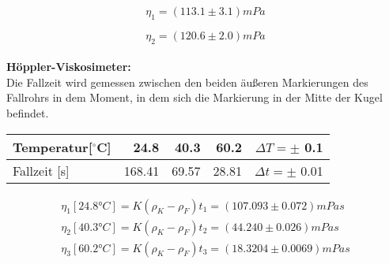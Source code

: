 \documentclass{article}
\begin{document}
$$  \eta_1 =   (113.1 \pm 3.1)mPa $$ 
 
$$  \eta_2 =   (120.6 \pm 2.0)mPa $$ \\

\textbf{Höppler-Viskosimeter:}\\
Die Fallzeit wird gemessen zwischen den beiden äußeren Markierungen des Fallrohrs in dem Moment, in dem sich die Markierung in der Mitte der Kugel befindet.\\
\begin{center}
\begin{tabular}{|l||r|r|r||r|}
\hline
Temperatur[$^\circ$C] & 24.8 & 40.3 & 60.2 & $\Delta T=\pm$ 0.1\\
\hline
Fallzeit [s] & 168.41 & 69.57 &  28.81 & $\Delta t=\pm$ 0.01\\
\hline
\end{tabular}
\end{center}
\begin{gather*}
\eta_1[24.8°C] = K (\rho_K - \rho_F)t_1%
=(107.093 \pm 0.072) mPa s\\
\eta_2[40.3°C] = K (\rho_K - \rho_F)t_2%
= (44.240 \pm 0.026) mPa s\\
\eta_3[60.2°C] = K (\rho_K - \rho_F)t_3%
= (18.3204 \pm 0.0069) mPa s\\
\end{gather*}
\end{document}
